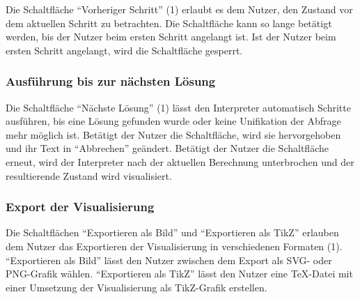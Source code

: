 \documentclass[parskip=full,11pt,twoside]{scrartcl}
\begin{document}
Die Schaltfläche \enquote{Vorheriger Schritt} (1) erlaubt es dem Nutzer, den Zustand vor dem aktuellen Schritt zu betrachten.
Die Schaltfläche kann so lange betätigt werden, bis der Nutzer beim ersten Schritt angelangt ist.
Ist der Nutzer beim ersten Schritt angelangt, wird die Schaltfläche gesperrt.

\subsubsection{Ausführung bis zur nächsten Lösung}

\begin{minipage}{\linewidth}
\end{minipage}

\begin{minipage}{\linewidth}
\end{minipage}

Die Schaltfläche \enquote{Nächste Lösung} (1) lässt den Interpreter automatisch Schritte ausführen, bis eine Lösung gefunden wurde oder keine Unifikation der Abfrage mehr möglich ist.
Betätigt der Nutzer die Schaltfläche, wird sie hervorgehoben und ihr Text in \enquote{Abbrechen} geändert.
Betätigt der Nutzer die Schaltfläche erneut, wird der Interpreter nach der aktuellen Berechnung unterbrochen und der resultierende Zustand wird visualisiert.

\subsubsection{Export der Visualisierung}

\begin{minipage}{\linewidth}
\end{minipage}

Die Schaltflächen \enquote{Exportieren als Bild} und \enquote{Exportieren als TikZ} erlauben dem Nutzer das Exportieren der Visualisierung in verschiedenen Formaten (1).
\enquote{Exportieren als Bild} lässt den Nutzer zwischen dem Export als SVG- oder PNG-Grafik wählen.
\enquote{Exportieren als TikZ} lässt den Nutzer eine TeX-Datei mit einer Umsetzung der Visualisierung als TikZ-Grafik erstellen.
\end{document}
